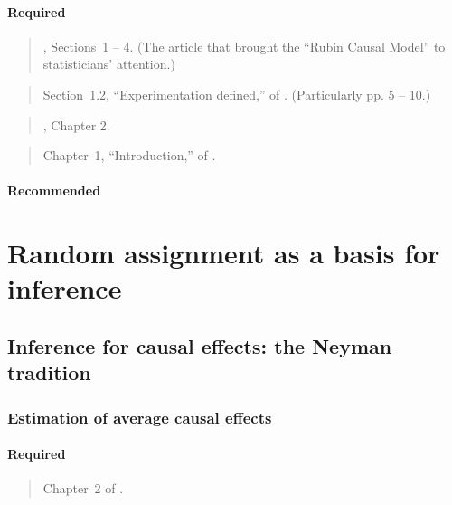 \documentclass[12pt]{article}
\begin{document}
\paragraph*{Required}

\begin{verse}, Sections~1 -- 4. (The article that brought the ``Rubin Causal Model'' to  statisticians' attention.)\end{verse}

\begin{verse} Section~1.2, ``Experimentation defined,''  of
.  (Particularly pp. 5 -- 10.) \end{verse}

\begin{verse} , Chapter 2. \end{verse}

\begin{verse} Chapter~1, ``Introduction,'' of .\end{verse}

\paragraph*{Recommended}

\begin{verse}  \end{verse}

\section{Random assignment as a basis for inference}

\subsection{Inference for causal effects: the Neyman tradition}

\subsubsection{Estimation of average causal effects} 

\paragraph*{Required}

\begin{verse}
  Chapter~2 of .
\end{verse}
\end{document}
